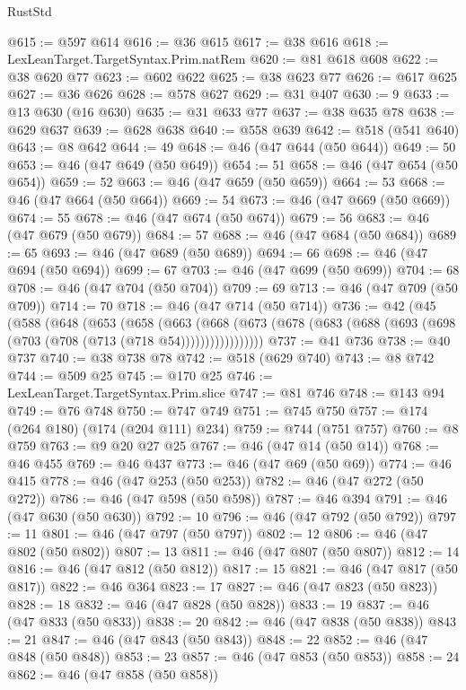 \begin{lexlean}{RustStd}
\begin{coremodule}
@615 := @597 @614
@616 := @36 @615
@617 := @38 @616
@618 := LexLeanTarget.TargetSyntax.Prim.natRem
@620 := @81 @618 @608
@622 := @38 @620 @77
@623 := @602 @622
@625 := @38 @623 @77
@626 := @617 @625
@627 := @36 @626
@628 := @578 @627
@629 := @31 @407
@630 := 9
@633 := @13 @630 (@16 @630)
@635 := @31 @633 @77
@637 := @38 @635 @78
@638 := @629 @637
@639 := @628 @638
@640 := @558 @639
@642 := @518 (@541 @640)
@643 := @8 @642
@644 := 49
@648 := @46 (@47 @644 (@50 @644))
@649 := 50
@653 := @46 (@47 @649 (@50 @649))
@654 := 51
@658 := @46 (@47 @654 (@50 @654))
@659 := 52
@663 := @46 (@47 @659 (@50 @659))
@664 := 53
@668 := @46 (@47 @664 (@50 @664))
@669 := 54
@673 := @46 (@47 @669 (@50 @669))
@674 := 55
@678 := @46 (@47 @674 (@50 @674))
@679 := 56
@683 := @46 (@47 @679 (@50 @679))
@684 := 57
@688 := @46 (@47 @684 (@50 @684))
@689 := 65
@693 := @46 (@47 @689 (@50 @689))
@694 := 66
@698 := @46 (@47 @694 (@50 @694))
@699 := 67
@703 := @46 (@47 @699 (@50 @699))
@704 := 68
@708 := @46 (@47 @704 (@50 @704))
@709 := 69
@713 := @46 (@47 @709 (@50 @709))
@714 := 70
@718 := @46 (@47 @714 (@50 @714))
@736 := @42
    (@45
      (@588
        (@648
          (@653
            (@658
              (@663
                (@668
                  (@673 (@678 (@683 (@688 (@693 (@698 (@703 (@708 (@713 (@718 @54)))))))))))))))))
@737 := @41 @736
@738 := @40 @737
@740 := @38 @738 @78
@742 := @518 (@629 @740)
@743 := @8 @742
@744 := @509 @25
@745 := @170 @25
@746 := LexLeanTarget.TargetSyntax.Prim.slice
@747 := @81 @746
@748 := @143 @94
@749 := @76 @748
@750 := @747 @749
@751 := @745 @750
@757 := @174 (@264 @180) (@174 (@204 @111) @234)
@759 := @744 (@751 @757)
@760 := @8 @759
@763 := @9 @20 @27 @25
@767 := @46 (@47 @14 (@50 @14))
@768 := @46 @455
@769 := @46 @437
@773 := @46 (@47 @69 (@50 @69))
@774 := @46 @415
@778 := @46 (@47 @253 (@50 @253))
@782 := @46 (@47 @272 (@50 @272))
@786 := @46 (@47 @598 (@50 @598))
@787 := @46 @394
@791 := @46 (@47 @630 (@50 @630))
@792 := 10
@796 := @46 (@47 @792 (@50 @792))
@797 := 11
@801 := @46 (@47 @797 (@50 @797))
@802 := 12
@806 := @46 (@47 @802 (@50 @802))
@807 := 13
@811 := @46 (@47 @807 (@50 @807))
@812 := 14
@816 := @46 (@47 @812 (@50 @812))
@817 := 15
@821 := @46 (@47 @817 (@50 @817))
@822 := @46 @364
@823 := 17
@827 := @46 (@47 @823 (@50 @823))
@828 := 18
@832 := @46 (@47 @828 (@50 @828))
@833 := 19
@837 := @46 (@47 @833 (@50 @833))
@838 := 20
@842 := @46 (@47 @838 (@50 @838))
@843 := 21
@847 := @46 (@47 @843 (@50 @843))
@848 := 22
@852 := @46 (@47 @848 (@50 @848))
@853 := 23
@857 := @46 (@47 @853 (@50 @853))
@858 := 24
@862 := @46 (@47 @858 (@50 @858))

\end{coremodule}
\end{lexlean}
